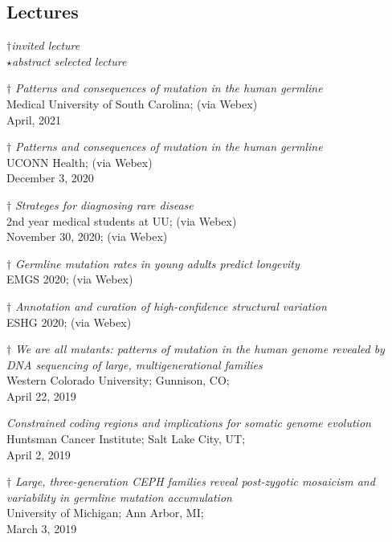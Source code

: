 \documentclass[margin,line]{cv}
\begin{document}
\begin{resume}
    \section{\mysidestyle Lectures}

    $\dagger$\textit{invited lecture}\\
    $\star$\textit{abstract selected lecture}

    $\dagger$ \textit{Patterns and consequences of mutation in the human germline} \\
    Medical University of South Carolina; (via Webex) \\
    April, 2021

    $\dagger$ \textit{Patterns and consequences of mutation in the human germline} \\
    UCONN Health; (via Webex) \\
    December 3, 2020

    $\dagger$ \textit{Strateges for diagnosing rare disease} \\
    2nd year medical students at UU; (via Webex) \\
    November 30, 2020; (via Webex)

    $\dagger$ \textit{Germline mutation rates in young adults predict longevity} \\
    EMGS 2020; (via Webex) 

    $\dagger$ \textit{Annotation and curation of high-confidence structural variation} \\
    ESHG 2020; (via Webex)

    $\dagger$ \textit{We are all mutants: patterns of mutation in the
human genome revealed by DNA sequencing of large, multigenerational families
} \\
    Western Colorado University; Gunnison, CO; \\
    April 22, 2019

    \textit{Constrained coding regions and implications for somatic genome evolution} \\
    Huntsman Cancer Institute; Salt Lake City, UT; \\
    April 2, 2019

    $\dagger$ \textit{Large, three-generation CEPH families reveal post-zygotic mosaicism and variability in germline mutation accumulation} \\
    University of Michigan; Ann Arbor, MI; \\
    March 3, 2019


\end{resume}
\end{document}
